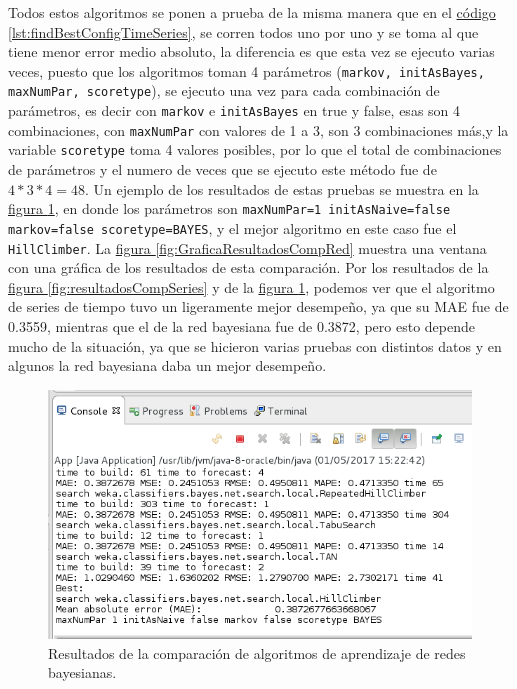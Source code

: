 Todos estos algoritmos se ponen a prueba de la misma manera que en el 
\hyperref[lst:findBestConfigTimeSeries]{código \ref{lst:findBestConfigTimeSeries}}, se corren todos uno por uno y se toma al que tiene menor error medio absoluto, la diferencia es que esta vez se ejecuto varias veces, puesto que los algoritmos toman 4 parámetros (\texttt{markov, initAsBayes, maxNumPar, scoretype}), se ejecuto una vez para cada combinación de parámetros, es decir con \texttt{markov} e \texttt{initAsBayes} en true y false, esas son 4 combinaciones, con \texttt{maxNumPar} con valores de 1 a 3, son 3 combinaciones más,y la variable \texttt{scoretype} toma 4 valores posibles, por lo que el total de combinaciones de parámetros y el numero de veces que se ejecuto este método fue de $4*3*4 = 48$. 
Un ejemplo de los resultados de estas pruebas se muestra en la 
\hyperref[fig:resultadosComparacionRed]{figura \ref{fig:resultadosComparacionRed}}, en donde los parámetros son \texttt{maxNumPar=1 initAsNaive=false markov=false scoretype=BAYES}, y el mejor algoritmo en este caso fue el \texttt{HillClimber}. 
La \hyperref[fig:GraficaResultadosCompRed]{ figura \ref{fig:GraficaResultadosCompRed}} muestra una ventana con una gráfica de los resultados de esta comparación. 
Por los resultados de la 
\hyperref[fig:resultadosCompSeries]{ figura \ref{fig:resultadosCompSeries}} y de la
\hyperref[fig:resultadosComparacionRed]{figura \ref{fig:resultadosComparacionRed}}, podemos ver que el algoritmo de series de tiempo tuvo un ligeramente mejor desempeño, ya que su MAE fue de 0.3559, mientras que el de la red bayesiana fue de 0.3872, pero esto depende mucho de la situación, ya que se hicieron varias pruebas con distintos datos y en algunos la red bayesiana daba un mejor desempeño.


\begin{figure}[ht]
	\centering
	\includegraphics[width=15cm]{img/resultadosComparacionRed.png}
	\caption{Resultados de la comparación de algoritmos de aprendizaje de redes bayesianas.}
	\label{fig:resultadosComparacionRed}
\end{figure}

